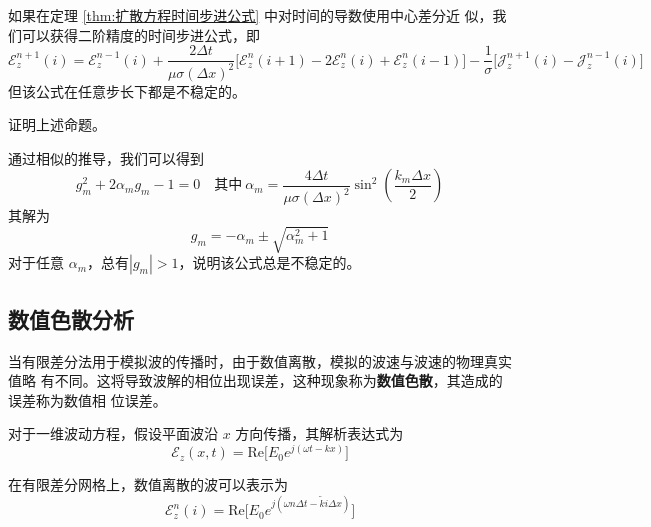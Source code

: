 \begin{proposition}
    如果在定理 \ref{thm:扩散方程时间步进公式} 中对时间的导数使用中心差分近
    似，我们可以获得二阶精度的时间步进公式，即
    \begin{equation}
        \mathscr{E}_z^{n+1}(i)=\mathscr{E}_z^{n-1}(i)
        +\frac{2\Delta t}{\mu \sigma (\Delta x)^2}
        \Big[\mathscr{E}_z^n(i+1)-2\mathscr{E}_z^n(i)+\mathscr{E}_z^n(i-1)\Big]
        -\frac{1}{\sigma}\Big[\mathscr{J}_z^{n+1}(i)-\mathscr{J}_z^{n-1}(i)\Big]
    \end{equation}
    但该公式在任意步长下都是不稳定的。
\end{proposition}

\begin{exercise}
    证明上述命题。
\end{exercise}

\begin{solution}
    通过相似的推导，我们可以得到
    \begin{equation*}
        g_m^2+2\alpha_m g_m-1=0 \quad \text{其中} 
        \ \alpha_m=\frac{4\Delta t}{\mu \sigma (\Delta x)^2} \sin^2\left(\frac{k_m \Delta x}{2}\right)  
    \end{equation*}
    其解为
    \begin{equation*}
        g_m=-\alpha_m \pm \sqrt{\alpha_m^2+1}
    \end{equation*}
    对于任意 $\alpha_m$，总有$|g_m|>1$，说明该公式总是不稳定的。
\end{solution}

\subsection{数值色散分析}

\par 当有限差分法用于模拟波的传播时，由于数值离散，模拟的波速与波速的物理真实值略
有不同。这将导致波解的相位出现误差，这种现象称为\textbf{数值色散}，其造成的误差称为数值相
位误差。

\par 对于一维波动方程，假设平面波沿 $x$ 方向传播，其解析表达式为
\begin{equation}
    \mathscr{E}_z(x,t)=\text{Re}\Big[E_0e^{j(\omega t-kx)}\Big]
\end{equation}
\par 在有限差分网格上，数值离散的波可以表示为
\begin{equation}
    \mathscr{E}^n_z(i)=\text{Re}\Big[E_0e^{j(\omega n \Delta t-\tilde{k} i\Delta x)}\Big]
    \label{数值波解}
\end{equation}

